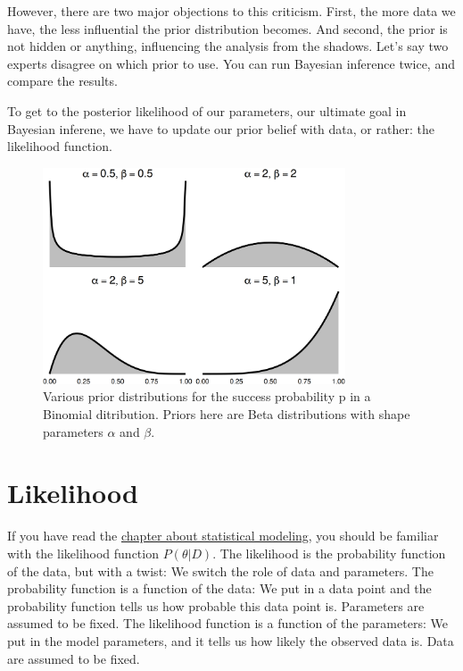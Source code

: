 \documentclass[
  10pt,
]{scrbook}
\begin{document}
However, there are two major objections to this criticism.
First, the more data we have, the less influential the prior distribution becomes.
And second, the prior is not hidden or anything, influencing the analysis from the shadows.
Let's say two experts disagree on which prior to use.
You can run Bayesian inference twice, and compare the results.

To get to the posterior likelihood of our parameters, our ultimate goal in Bayesian inferene, we have to update our prior belief with data, or rather: the likelihood function.

\begin{figure}

{\centering \includegraphics[width=0.8\textwidth]{figures/priors-1} 

}

\caption{Various prior distributions for the success probability p in a Binomial ditribution. Priors here are Beta distributions with shape parameters $\alpha$ and $\beta$.}\label{fig:priors}
\end{figure}

\hypertarget{likelihood}{%
\section{Likelihood}\label{likelihood}}

If you have read the \protect\hyperlink{statistical-modeling}{chapter about statistical modeling}, you should be familiar with the likelihood function \(P(\theta | D)\).
The likelihood is the probability function of the data, but with a twist:
We switch the role of data and parameters.
The probability function is a function of the data: We put in a data point and the probability function tells us how probable this data point is. Parameters are assumed to be fixed.
The likelihood function is a function of the parameters: We put in the model parameters, and it tells us how likely the observed data is. Data are assumed to be fixed.
\end{document}

